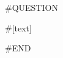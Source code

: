 \documentclass[a4paper]{article}
\newenvironment{exercise}{
  \begin{framed}}{
  \end{framed}}
\begin{document}
#QUESTION
\begin{exercise}
#[text]
\end{exercise}
\clearpage
#END
\end{document}
